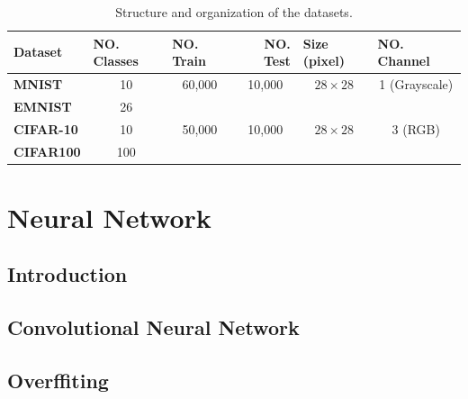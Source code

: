 \begin{table}[]
  \label{dataset_table}
  \begin{tabular}{
      l |
      c
      c
      c
      c
      c}
    \hline
    {\textbf{Dataset}}  & \multicolumn{1}{l}{{\textbf{NO. Classes}}} & \multicolumn{1}{l}{{\textbf{NO. Train}}} & \multicolumn{1}{r}{{\textbf{NO. Test}}} & \multicolumn{1}{l}{{\textbf{Size (pixel)}}} & \multicolumn{1}{l}{{\textbf{NO. Channel}}} \\ \hline
    {\textbf{MNIST}}    & 10                                         & 60,000                                   & 10,000                                  & $28\times28$                                & 1 (Grayscale)                              \\
    {\textbf{EMNIST}}   & 26                                         &                                          &                                         &                                             &                                            \\
    {\textbf{CIFAR-10}} & 10                                         & 50,000                                   & 10,000                                  & $28\times28$                                & 3 (RGB)                                    \\
    {\textbf{CIFAR100}} & 100                                        &                                          &                                         &                                             &                                            \\ \hline
  \end{tabular}
  \caption{Structure and organization of the datasets.}
\end{table}


\chapter{Neural Network}
\section{Introduction}
\section{Convolutional Neural Network}
\section{Overffiting}


